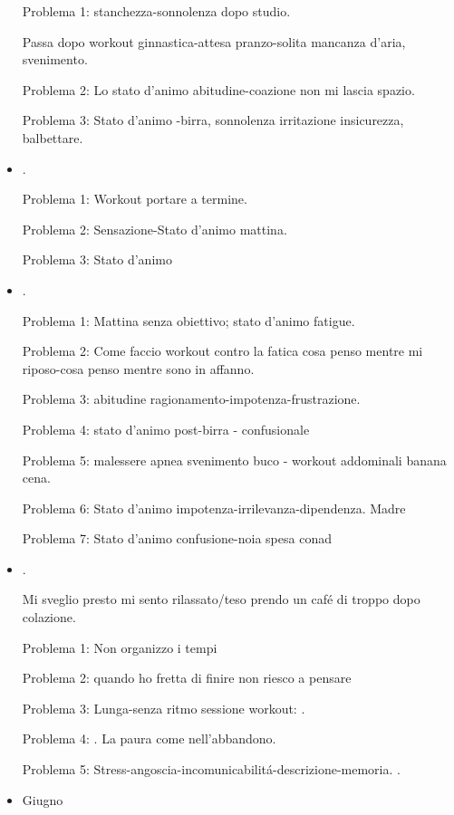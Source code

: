 \begin{itemize}
Problema 1: stanchezza-sonnolenza dopo studio.

Passa dopo workout ginnastica-attesa pranzo-solita mancanza d'aria, svenimento.

Problema 2: Lo stato d'animo abitudine-coazione non mi lascia spazio.

Problema 3: Stato d'animo -birra, sonnolenza irritazione insicurezza, balbettare.

\item {}.

Problema 1: Workout portare a termine.

Problema 2: Sensazione-Stato d'animo mattina.

Problema 3: Stato d'animo 

\item {}.

Problema 1: Mattina senza obiettivo; stato d'animo fatigue.

Problema 2: Come faccio workout contro la fatica cosa penso mentre mi riposo-cosa penso mentre sono in affanno.

Problema 3: abitudine ragionamento-impotenza-frustrazione.

Problema 4: stato d'animo post-birra - confusionale

Problema 5: malessere apnea svenimento buco - workout addominali banana cena.

Problema 6: Stato d'animo impotenza-irrilevanza-dipendenza. Madre

Problema 7: Stato d'animo confusione-noia spesa conad  

\item {}.

Mi sveglio presto mi sento rilassato/teso prendo un caf\'e di troppo dopo colazione.

Problema 1: Non organizzo i tempi

Problema 2: quando ho fretta di finire non riesco a pensare

Problema 3: Lunga-senza ritmo sessione workout: .

Problema 4: . La paura come nell'abbandono.

Problema 5: Stress-angoscia-incomunicabilit\'a-descrizione-memoria. .

\item Giugno


\end{itemize}
